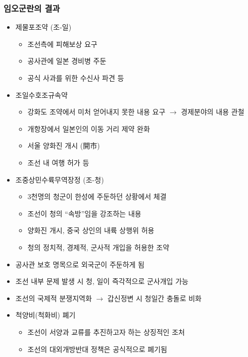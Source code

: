 \subsubsection*{임오군란의 결과}

\begin{itemize}
    \item 제물포조약 (조-일)
    \begin{itemize}
        \item 조선측에 피해보상 요구
        \item 공사관에 일본 경비병 주둔
        \item 공식 사과를 위한 수신사 파견 등
    \end{itemize}
    \item 조일수호조규속약
    \begin{itemize}
        \item 강화도 조약에서 미처 얻어내지 못한 내용 요구 $\rightarrow$ 경제분야의 내용 관철
        \item 개항장에서 일본인의 이동 거리 제약 완화
        \item 서울 양화진 개시 (開市)
        \item 조선 내 여행 허가 등
    \end{itemize}
    \item 조중상민수륙무역장정 (조-청)
    \begin{itemize}
        \item 3천명의 청군이 한성에 주둔하던 상황에서 체결
        \item 조선이 청의 ``속방''임을 강조하는 내용
        \item 양화진 개시, 중국 상인의 내륙 상행위 허용
        \item 청의 정치적, 경제적, 군사적 개입을 허용한 조약
    \end{itemize}
    \item 공사관 보호 명목으로 외국군이 주둔하게 됨
    \item 조선 내부 문제 발생 시 청, 일이 즉각적으로 군사개입 가능
    \item 조선의 국제적 분쟁지역화 $\rightarrow$ 갑신정변 시 청일간 충돌로 비화
    \item 척양비(척화비) 폐기
    \begin{itemize}
        \item 조선이 서양과 교류를 추진하고자 하는 상징적인 조처
        \item 조선의 대외개방반대 정책은 공식적으로 폐기됨
    \end{itemize}
\end{itemize}
